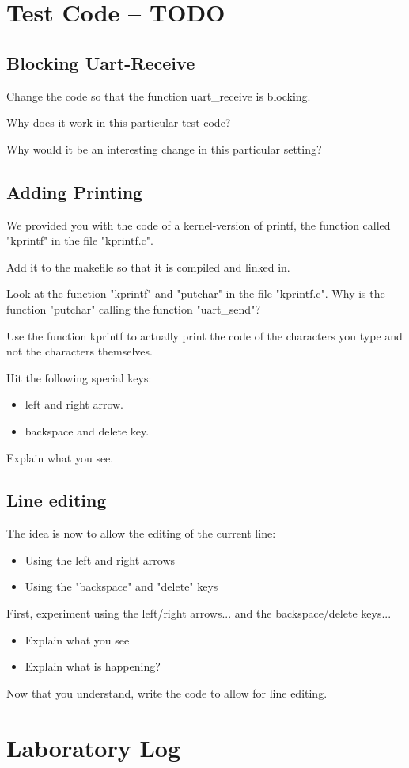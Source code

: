 \documentclass[10]{article}
\begin{document}
\section{Test Code -- TODO}

\subsection{Blocking Uart-Receive}

Change the code so that the function uart\_receive is blocking.

Why does it work in this particular test code?

Why would it be an interesting change in this particular setting?

\subsection{Adding Printing}

We provided you with the code of a kernel-version of printf,
the function called "kprintf" in the file "kprintf.c".

Add it to the makefile so that it is compiled and linked in.

Look at the function "kprintf" and "putchar" in the file
"kprintf.c". Why is the function "putchar" calling the
function "uart\_send"?

Use the function kprintf to actually print the code of the
characters you type and not the characters themselves.

Hit the following special keys:

\begin{itemize}
\item left and right arrow.
\item backspace and delete key.
\end{itemize}

Explain what you see.
      
\subsection{Line editing}

The idea is now to allow the editing of the current line:

\begin{itemize}
\item Using the left and right arrows
\item Using the "backspace" and "delete" keys 
\end{itemize}

First, experiment using the left/right arrows...
and the backspace/delete keys... 

\begin{itemize}
\item Explain what you see
\item Explain what is happening?
\end{itemize}

Now that you understand, write the code to allow for line editing.

\section{Laboratory Log}
\end{document}

